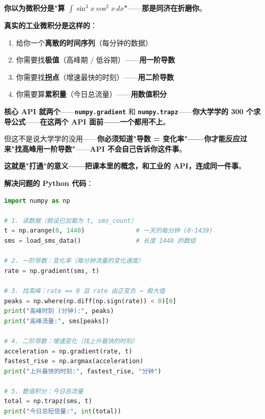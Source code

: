 \begin{tcolorbox}[ahabox={Aha: 微积分就是数据工程师的日常}]
\textbf{你以为微积分是"算 $\int \sin^3 x \cos^2 x \, dx$"}——\textbf{那是同济在折磨你}。

\medskip

\textbf{真实的工业微积分是这样的}：

\begin{enumerate}
\item 给你一个\textbf{离散的时间序列}（每分钟的数据）
\item 你需要找\textbf{极值}（高峰期 / 低谷期）——\textbf{用一阶导数}
\item 你需要找\textbf{拐点}（增速最快的时刻）——\textbf{用二阶导数}
\item 你需要算\textbf{累积量}（今日总流量）——\textbf{用数值积分}
\end{enumerate}

\medskip

\textbf{核心 API 就两个}——\textbf{\texttt{numpy.gradient}} 和 \textbf{\texttt{numpy.trapz}}——\textbf{你大学学的 300 个求导公式}——\textbf{在这两个 API 面前——一个都用不上}。

\medskip

但这不是说大学学的没用——\textbf{你必须知道"导数 = 变化率"——你才能反应过来"找高峰用一阶导数"}——\textbf{API 不会自己告诉你这件事}。

\medskip

\textbf{这就是"打通"的意义——把课本里的概念，和工业的 API，连成同一件事}。
\end{tcolorbox}

\textbf{解决问题的 Python 代码}：

\begin{lstlisting}[language=Python]
import numpy as np

# 1. 读数据（假设已加载为 t, sms_count）
t = np.arange(0, 1440)              # 一天的每分钟 (0-1439)
sms = load_sms_data()               # 长度 1440 的数组

# 2. 一阶导数：变化率（每分钟流量的变化速度）
rate = np.gradient(sms, t)

# 3. 找高峰：rate == 0 且 rate 由正变负 → 极大值
peaks = np.where(np.diff(np.sign(rate)) < 0)[0]
print("高峰时刻 (分钟):", peaks)
print("高峰流量:", sms[peaks])

# 4. 二阶导数：增速变化（找上升最快的时刻）
acceleration = np.gradient(rate, t)
fastest_rise = np.argmax(acceleration)
print("上升最快的时刻:", fastest_rise, "分钟")

# 5. 数值积分：今日总流量
total = np.trapz(sms, t)
print("今日总短信量:", int(total))
\end{lstlisting}

